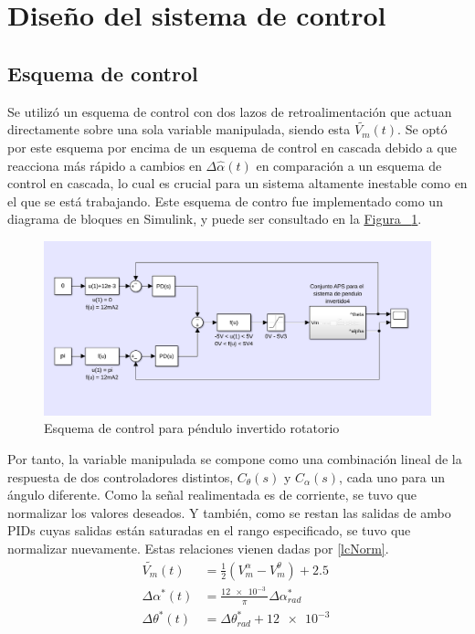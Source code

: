\section{Diseño del sistema de control}
\subsection{Esquema de control}
Se utilizó un esquema de control con dos lazos de retroalimentación que actuan
directamente sobre una sola variable manipulada, siendo esta $\widetilde{V_m}(t)$.
Se optó por este esquema por encima de un esquema de control en cascada debido a que reacciona
más rápido a cambios en $\Delta\hat{\alpha}(t)$ en comparación a un esquema de control en cascada,
lo cual es crucial para un sistema altamente inestable como en el que se está trabajando.
Este esquema de contro fue implementado como un diagrama de bloques en Simulink, y puede ser
consultado en la \hyperref[db]{Figura ~\ref{db}}.

\begin{figure}
    \centering
    \includegraphics[width = 0.8\linewidth]{figs/lc.png}
    \caption{Esquema de control para péndulo invertido rotatorio}
    \label{db}
\end{figure}

Por tanto, la variable manipulada se compone como una combinación lineal de la respuesta de dos controladores
distintos, $C_{\theta}(s)$ y $C_{\alpha}(s)$, cada uno para un ángulo diferente.
Como la señal realimentada es de corriente, se tuvo que normalizar los 
valores deseados.
Y también, como se restan las salidas de ambo PIDs cuyas salidas están saturadas en el rango
especificado, se tuvo que normalizar nuevamente. 
Estas relaciones vienen dadas por \eqref{lcNorm}.
\begin{equation}
    \begin{aligned}
        \widetilde{V_m}(t) &= \frac{1}{2}(V_m^\alpha - V_m^\theta) + 2.5\label{lcNorm}\\
        \Delta\alpha^*(t) &= \frac{ \SI{12e-3}{}}{\pi}\Delta\alpha^*_{rad}\\
        \Delta\theta^*(t) &= \Delta\theta^*_{rad}+ \SI{12e-3}{}\\
    \end{aligned}
\end{equation}
